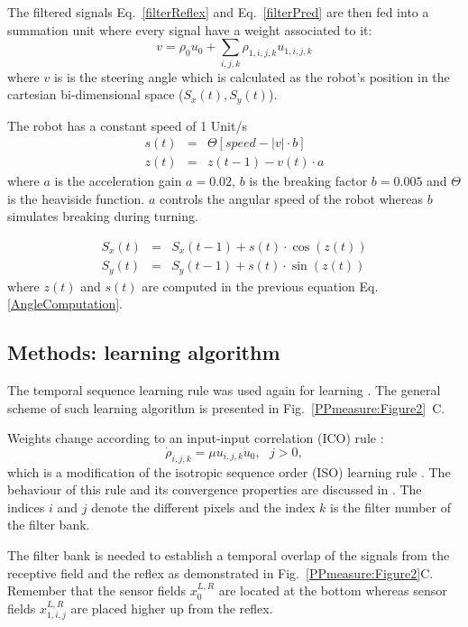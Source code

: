 The filtered signals Eq.~\ref{filterReflex} and Eq.~\ref{filterPred}
are then fed into a summation unit where every signal
have a weight associated to it:
\begin{equation}
v = \rho_0 u_0 + \sum\limits_{i,j,k} \rho_{1,i,j,k} u_{1,i,j,k}
\label{NeuralOutput}
\end{equation}
where $v$ is is the steering angle which is calculated as the robot's
position in the cartesian bi-dimensional space ($S_x(t), S_y(t)$).

The robot has a constant speed of 1 Unit/s
\begin{eqnarray}
	s(t)& = & \Theta\left[speed-|v|\cdot b\right ]\\
	z(t)& = & z(t-1)-v(t) \cdot a \label{AngleComputation}
\end{eqnarray}
where $a$ is the acceleration gain 
$a=0.02$, $b$ is the breaking factor $b=0.005$ and $\Theta$
is the heaviside function.
$a$ controls the angular speed of the robot whereas $b$ simulates
breaking during turning.

\begin{eqnarray}
	S_x(t) & = & S_x(t-1)+s(t)\cdot\cos(z(t))\label{PositionComputationx}\\
	S_y(t) & = & S_y(t-1)+s(t)\cdot\sin(z(t))\label{PositionComputationy}
\end{eqnarray}
where $z(t)$ and $s(t)$ are computed in the previous equation
Eq.\ref{AngleComputation}.


\subsection{Methods: learning algorithm}

The temporal sequence learning rule was used again for learning \citep{Porr2006ICO}. 
The general scheme of such learning algorithm is presented in Fig.~\ref{PPmeasure:Figure2}~C. 

Weights change according to an input-input correlation (ICO) rule :
\begin{equation}
\dot\rho_{i,j,k} = \mu u_{i,j,k} \dot{u}_0,~~~j>0,
\end{equation}
which is a modification of the isotropic sequence order (ISO) learning rule \citep{Porr2003b}. 
The behaviour of this rule and its convergence properties are discussed in \citep{Porr2006ICO}. 
The indices $i$ and $j$ denote the different pixels and the index
$k$ is the filter number of the filter bank. 

The filter bank is needed to establish a temporal overlap of the
signals from the receptive field and the reflex
as demonstrated in
Fig.~\ref{PPmeasure:Figure2}C.
Remember that the
sensor fields $x_0^{L,R}$ are located at the bottom whereas sensor
fields $x_{1,i,j}^{L,R}$ are placed higher up from the reflex.

